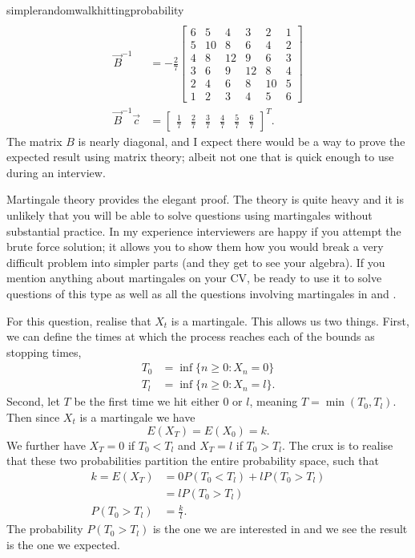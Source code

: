 \begin{answer}{simplerandomwalkhittingprobability}
\begin{align*}
\\
\vec{B}^{-1} &=
-
\frac{2}{7}
\left[\begin{matrix}6 & 5 & 4 & 3 & 2 & 1\\5 & 10 & 8 & 6 & 4 & 2\\4 & 8 & 12 & 9 & 6 & 3\\3 & 6 & 9 & 12 & 8 & 4\\2 & 4 & 6 & 8 & 10 & 5\\1 & 2 & 3 & 4 & 5 & 6\end{matrix}\right]
\\
\vec{B}^{-1}\vec{c}
&=
\left[\begin{matrix}\frac{1}{7} & \frac{2}{7} & \frac{3}{7} & \frac{4}{7} & \frac{5}{7} & \frac{6}{7}\end{matrix}\right]^{T}
\text{.}
\end{align*}
The matrix $B$ is nearly diagonal, and I expect there would be a way to prove the expected result using matrix theory; albeit not one that is quick enough to use during an interview.

Martingale theory provides the elegant proof.
The theory is quite heavy and it is unlikely that you will be able to solve questions using martingales without substantial practice.
In my experience interviewers are happy if you attempt the brute force solution; it allows you to show them how you would break a very difficult problem into simpler parts (and they get to see your algebra).
If you mention anything about martingales on your CV, be ready to use it to solve questions of this type as well as all the questions involving martingales in \citet{JoshiQA} and \citet{HeardOnTheStreet}.

For this question, realise that $X_t$ is a martingale.
This allows us two things.
First, we can define
the times at which the process reaches each of the bounds as stopping times,
\begin{align*}
  T_0 &= \inf\{ n \geq 0: X_n = 0\} \\
  T_l &= \inf\{ n \geq 0: X_n = l\}
  \text{.}
\end{align*}
Second, let $T$ be the first time we hit either $0$ or $l$, meaning $T = \min(T_0 , T_l)$.
Then since $X_t$ is a martingale we have
\[
E(X_T) =  E(X_0) = k
\text{.}
\]
We further have
$X_T=0$ if $T_0 < T_l$
and
$X_T=l$ if $T_0 > T_l$.
The crux is to realise that these two probabilities partition the entire probability space, such that
\begin{align*}
k = E(X_T) &=  0 P(T_0 < T_l) + l P(T_0 > T_l) \\
           &=  l P(T_0 > T_l)  \\
P(T_0 > T_l) &= \frac{k}{l}
\text{.}
\end{align*}
The probability $P(T_0 > T_l)$ is the one we are interested in and we see the result is the one we expected.
\end{answer}
